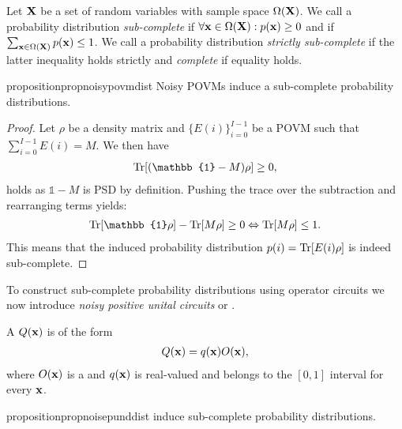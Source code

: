 \begin{definition}
	Let $\mathbf{X}$ be a set of random variables with sample space $\Omega(\mathbf{X})$. We call a probability distribution \textit{sub-complete} if $\forall \mathbf{x} \in \Omega(\mathbf{X}): p(\mathbf{x})\geq 0$ and if $\sum_{\mathbf{x} \in \Omega(\mathbf{X})} p(\mathbf{x})\leq 1$. We call a probability distribution \textit{strictly sub-complete} if the latter inequality holds strictly and \textit{complete} if equality holds.
\end{definition}




\begin{restatable}{proposition}{propnoisypovmdist}
	\label{prop:noisypovmdist}
	Noisy POVMs induce a sub-complete probability distributions.
\end{restatable}

\begin{proof}
	Let $\rho$ be a density matrix and $\{E(i)\}_{i=0}^{I-1} $ be a POVM such that $\sum_{i=0}^{I-1} E(i)=M$. We then have
	\begin{align}
		\Tr[(\mathbb{1}-M) \rho]\geq 0,
	\end{align}
	holds as $\mathbb{1}-M$ is PSD by definition.
	Pushing the trace over the subtraction and rearranging terms yields:
	\begin{align}
		\Tr[\mathbb{1} \rho]- 	\Tr[M \rho]\geq 0 \Leftrightarrow \Tr[M \rho]\leq 1.
	\end{align}
	This means that the induced probability distribution $p(i)= \Tr[E(i)\rho]$ is indeed sub-complete.
\end{proof}






To construct sub-complete probability distributions using operator circuits we now introduce \textit{noisy positive unital circuits} or \noisepuncs.

\begin{definition}
	\label{def:noisepunc}
	A \noisepunc $Q(\mathbf{x})$ is of the form
	\begin{align}
		Q(\mathbf{x})= q(\mathbf{x}) O(\mathbf{x}),
	\end{align}
	where $O(\mathbf{x})$ is a \punc and $q(\mathbf{x})$ is real-valued and belongs to the  $[0,1]$ interval for every $\mathbf{x}$.
\end{definition}



\begin{restatable}{proposition}{propnoisepunddist}
	\label{prop:noisepunddist}
	\noisepuncs induce sub-complete probability distributions.
\end{restatable}

